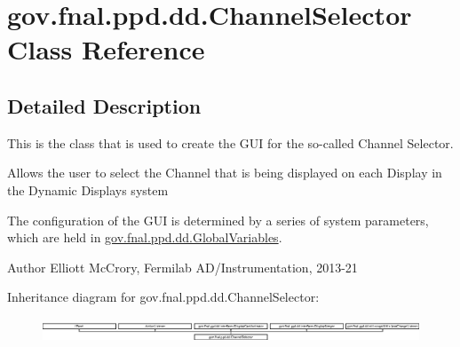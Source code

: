 \hypertarget{classgov_1_1fnal_1_1ppd_1_1dd_1_1ChannelSelector}{\section{gov.\-fnal.\-ppd.\-dd.\-Channel\-Selector Class Reference}
\label{classgov_1_1fnal_1_1ppd_1_1dd_1_1ChannelSelector}
}


\subsection{Detailed Description}
This is the class that is used to create the G\-U\-I for the so-\/called Channel Selector. 

Allows the user to select the Channel that is being displayed on each Display in the Dynamic Displays system 

The configuration of the G\-U\-I is determined by a series of system parameters, which are held in \hyperlink{classgov_1_1fnal_1_1ppd_1_1dd_1_1GlobalVariables}{gov.\-fnal.\-ppd.\-dd.\-Global\-Variables}. 

\begin{DoxyAuthor}{Author}
Elliott Mc\-Crory, Fermilab A\-D/\-Instrumentation, 2013-\/21 
\end{DoxyAuthor}
Inheritance diagram for gov.\-fnal.\-ppd.\-dd.\-Channel\-Selector\-:\begin{figure}[H]
\begin{center}
\leavevmode
\includegraphics[height=0.711111cm]{classgov_1_1fnal_1_1ppd_1_1dd_1_1ChannelSelector}
\end{center}
\end{figure}
